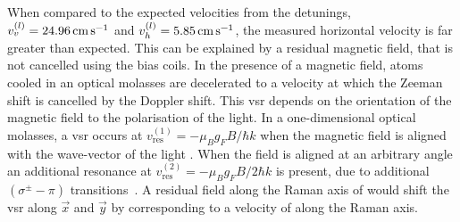 \par\noindent
When compared to the expected velocities from the detunings,
\(v^{(l)}_v = \sivalue{24.96}{\centi\metre\per\second}\) and
\(v^{(l)}_h = \sivalue{5.85}{\centi\metre\per\second}\), the measured
horizontal velocity is far greater than expected. This can be
explained by a residual magnetic field, that is not cancelled using
the bias coils. In the presence of a magnetic field, atoms cooled in
an optical molasses are decelerated to a velocity at which the Zeeman
shift is cancelled by the Doppler shift. This \ac{vsr} depends on the
orientation of the magnetic field to the polarisation of the light. In
a one-dimensional optical molasses, a {vsr} occurs at
\(v_\text{res}^{(1)} = - \mu_B g_F B/\hbar k\) when the magnetic field
is aligned with the wave-vector of the light \cite{VanderStraten1993}.
When the field is aligned at an arbitrary angle an additional
resonance at \(v_\text{res}^{(2)} = - \mu_B g_F B/2\hbar k\) is
present, due to additional \(\left(\sigma^{\pm}-\pi\right)\)
transitions~\cite{Chang2002}. A residual field along the Raman axis of
 would shift the \ac{vsr} along \(\vec{x}\)
and \(\vec{y}\) by 
corresponding to a velocity of 
along the Raman axis. 

